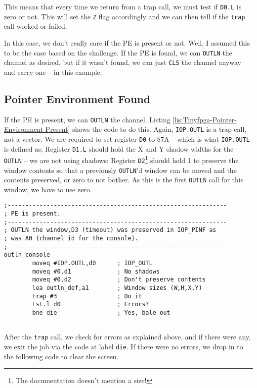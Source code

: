 This means that every time we return from a trap call, we must test
if \texttt{D0.L} is zero or not. This will set the \texttt{Z} flag
accordingly and we can then tell if the \texttt{trap} call worked
or failed.

In this case, we don't really care if the PE is present or not. Well,
I assumed this to be the case based on the challenge. If the PE is
found, we can \texttt{OUTLN} the channel as desired, but if it wasn't
found, we can just \texttt{CLS} the channel anyway and carry one --
in this example.

\subsection{Pointer Environment Found}

If the PE is present, we can \texttt{OUTLN} the channel. Listing \ref{lis:Tinyfpga-Pointer-Environment-Present}
shows the code to do this. Again, \texttt{IOP.OUTL} is a trap call,
not a vector. We are required to set register \texttt{D0} to \$7A
-- which is what \texttt{IOP.OUTL} is defined as; Register \texttt{D1.L}
should hold the X and Y shadow widths for the \texttt{OUTLN} -- we
are not using shadows; Register \texttt{D2}\footnote{The documentation doesn't mention a size!}
should hold 1 to preserve the window contents so that a previously
\texttt{OUTLN}'d window can be moved and the contents preserved, or
zero to not bother. As this is the first \texttt{OUTLN} call for this
window, we have to use zero.

\begin{lstlisting}[caption={Tinyfpga - Pointer Environment Present},label={lis:Tinyfpga-Pointer-Environment-Present}]
;--------------------------------------------------------------
; PE is present.
;--------------------------------------------------------------
; OUTLN the window,D3 (timeout) was preserved in IOP_PINF as 
; was A0 (channel id for the console).
;--------------------------------------------------------------
outln_console
        moveq #IOP.OUTL,d0      ; IOP_OUTL
        moveq #0,d1             ; No shadows
        moveq #0,d2             ; Don't preserve contents
        lea outln_def,a1        ; Window sizes (W,H,X,Y)
        trap #3                 ; Do it
        tst.l d0                ; Errors?
        bne die                 ; Yes, bale out
        
\end{lstlisting}

After the \texttt{trap} call, we check for errors as explained above,
and if there were any, we exit the job via the code at label \texttt{die}.
If there were no errors, we drop in to the following code to clear
the screen. 

